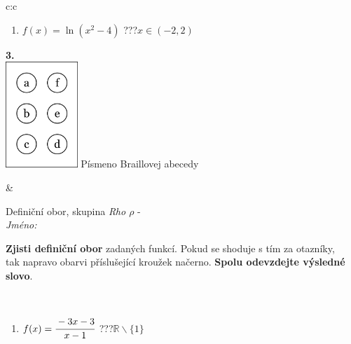 \documentclass[10pt]{report}
\begin{document}
\begin{tabular}{c:c}
\begin{minipage}[c][104.5mm][t]{0.5\linewidth}
\begin{center}
\begin{minipage}{0.79\linewidth}
\begin{center}
\begin{varwidth}{\linewidth}
\begin{enumerate}
\item $f(x)=\ln{(x^2-4)}$\quad \dotfill\; ???\;\dotfill \quad $x\in(-2 , 2)$
\end{enumerate}
\end{varwidth}
\end{center}
\end{minipage}
\begin{minipage}{0.20\linewidth}
\begin{center}
{\Huge\bfseries 3.} \\[2mm]
\includegraphics[height=40mm]{../images/braille.png}
{\small Písmeno Braillovej abecedy}
\end{center}
\end{minipage}
\end{center}
\end{minipage}
&
\begin{minipage}[c][104.5mm][t]{0.5\linewidth}
\begin{center}
\vspace{7mm}
{\huge Definiční obor, skupina \textit{Rho $\rho$} -}\\[5mm]
\textit{Jméno:}\phantom{xxxxxxxxxxxxxxxxxxxxxxxxxxxxxxxxxxxxxxxxxxxxxxxxxxxxxxxxxxxxxxxxx}\\[5mm]
\begin{minipage}{0.95\linewidth}
\begin{center}
\textbf{Zjisti definiční obor} zadaných funkcí. Pokud se shoduje s tím za otazníky,\\tak napravo obarvi příslušející kroužek načerno. \textbf{Spolu odevzdejte výsledné slovo}.
\end{center}
\end{minipage}
\\[1mm]
\begin{minipage}{0.79\linewidth}
\begin{center}
\begin{varwidth}{\linewidth}
\begin{enumerate}
\normalsizerrr
\item $f(x)=\cfrac{-3x-3}{x-1}$\quad \dotfill\; ???\;\dotfill \quad $\mathbb{R}\smallsetminus\{1\}$

\end{enumerate}
\end{varwidth}
\end{center}
\end{minipage}
\end{center}
\end{minipage}
\end{tabular}
\end{document}
